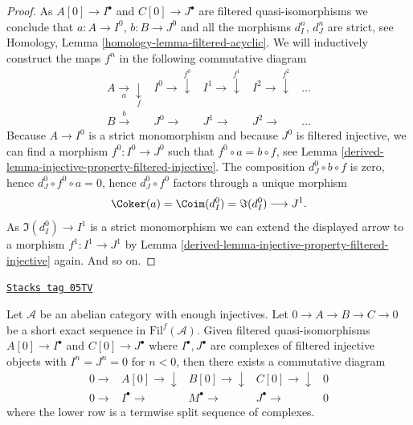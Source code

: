 \begin{proof}

As $A[0] \to I^\bullet$ and $C[0] \to J^\bullet$ are filtered
quasi-isomorphisms we conclude that $a : A \to I^0$, $b : B \to J^0$
and all the morphisms $d_I^n$, $d_J^n$ are strict, see
Homology, Lemma \ref{homology-lemma-filtered-acyclic}.
We will inductively construct the maps $f^n$ in the following
commutative diagram
$$
\begin{array}{ccccc}A \underset{a}{\longrightarrow}\underset{f}{\downarrow} & I^0 \longrightarrow\overset{f^0}{\downarrow} & I^1 \longrightarrow\overset{f^1}{\downarrow} & I^2 \longrightarrow\overset{f^2}{\downarrow} & \ldots \\ B \overset{b}{\longrightarrow} & J^0 \longrightarrow & J^1 \longrightarrow & J^2 \longrightarrow & \ldots\end{array}
$$
Because $A \to I^0$ is a strict monomorphism and because
$J^0$ is filtered injective, we can find a morphism $f^0 : I^0 \to J^0$
such that $f^0 \circ a = b \circ f$, see
Lemma \ref{derived-lemma-injective-property-filtered-injective}.
The composition $d_J^0 \circ b \circ f$ is zero, hence
$d_J^0 \circ f^0 \circ a = 0$, hence $d_J^0 \circ f^0$ factors
through a unique morphism
$$
\Coker(a) = \Coim(d_I^0) = \Im(d_I^0) \longrightarrow J^1.
$$
As $\Im(d_I^0) \to I^1$ is a strict monomorphism we can extend the
displayed arrow to a morphism $f^1 : I^1 \to J^1$ by
Lemma \ref{derived-lemma-injective-property-filtered-injective}
again. And so on.
\end{proof}

\begin{lemma}
\label{derived-lemma-filtered-injective-right-resolution-ses}
\href{https://stacks.math.columbia.edu/tag/05TV}{\texttt{Stacks tag 05TV}}

Let $\mathcal{A}$ be an abelian category with enough injectives.
Let $0 \to A \to B \to C \to 0$ be a short exact sequence in
$\text{Fil}^f(\mathcal{A})$.
Given filtered quasi-isomorphisms $A[0] \to I^\bullet$ and
$C[0] \to J^\bullet$ where $I^\bullet, J^\bullet$ are complexes of
filtered injective objects with $I^n = J^n = 0$ for $n < 0$, then
there exists a commutative diagram
$$
\begin{array}{ccccc}0 \longrightarrow & A[0] \longrightarrow\downarrow & B[0] \longrightarrow\downarrow & C[0] \longrightarrow\downarrow & 0 \\ 0 \longrightarrow & I^\bullet \longrightarrow & M^\bullet \longrightarrow & J^\bullet \longrightarrow & 0\end{array}
$$
where the lower row is a termwise split sequence of complexes.
\end{lemma}

